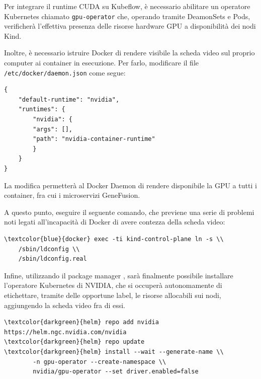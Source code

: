 Per integrare il runtime CUDA su Kubeflow, è necessario abilitare un operatore Kubernetes chiamato {\small \verb|gpu-operator|} che, operando tramite DeamonSets e Pods, verificherà l'effettiva presenza delle risorse hardware GPU a disponibilità dei nodi Kind.

Inoltre, è necessario istruire Docker di rendere visibile la scheda video sul proprio computer ai container in esecuzione. Per farlo, modificare il file {\small \verb|/etc/docker/daemon.json|} come segue:

\begin{code}
\label{code:apx:a:json}
\begin{verbatim}
{
    "default-runtime": "nvidia",
    "runtimes": {
        "nvidia": {
        "args": [],
        "path": "nvidia-container-runtime"
        }
    }
}
\end{verbatim}
\end{code}

La modifica permetterà al Docker Daemon di rendere disponibile la GPU a tutti i container, fra cui i microservizi GeneFusion.

A questo punto, eseguire il seguente comando, che previene una serie di problemi noti legati all'incapacità di Docker di avere contezza della scheda video:

\begin{small}
\begin{Verbatim}[commandchars=\\\{\}]
\textcolor{blue}{docker} exec -ti kind-control-plane ln -s \\
    /sbin/ldconfig \\
    /sbin/ldconfig.real
\end{Verbatim}
\end{small}

Infine, utilizzando il package manager , sarà finalmente possibile installare l'operatore Kubernetes di NVIDIA, che si occuperà autonomamente di etichettare, tramite delle opportune label, le risorse allocabili sui nodi, aggiungendo la scheda video fra di essi.

\begin{small}
\begin{Verbatim}[commandchars=\\\{\}]
\textcolor{darkgreen}{helm} repo add nvidia https://helm.ngc.nvidia.com/nvidia
\textcolor{darkgreen}{helm} repo update
\textcolor{darkgreen}{helm} install --wait --generate-name \\
        -n gpu-operator --create-namespace \\
        nvidia/gpu-operator --set driver.enabled=false
\end{Verbatim}
\end{small}

